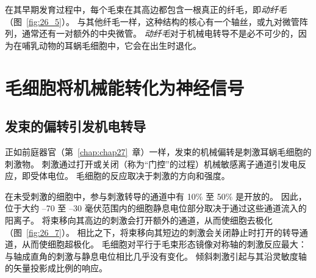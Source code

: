 在其早期发育过程中，每个毛束在其高边都包含一根真正的纤毛，即\textit{动纤毛}（图~\ref{fig:26_5}）。 
与其他纤毛一样，这种结构的核心有一个轴丝，或九对微管阵列，通常还有一对额外的中央微管。
\textit{动纤毛}对于机械电转导不是必不可少的，因为在哺乳动物的耳蜗毛细胞中，它会在出生时退化。



\section{毛细胞将机械能转化为神经信号}

\subsection{发束的偏转引发机电转导}

正如前庭器官（第~\ref{chap:chap27}~章）一样，发束的机械偏转是刺激耳蜗毛细胞的刺激物。
刺激通过打开或关闭（称为“门控”的过程）机械敏感离子通道引发电反应，即受体电位。
毛细胞的反应取决于刺激的方向和强度。


在未受刺激的细胞中，参与刺激转导的通道中有 10\% 至 50\% 是开放的。
因此，位于大约 –70 至 –30 毫伏范围内的细胞静息电位部分取决于通过这些通道流入的阳离子。
将束移向其高边的刺激会打开额外的通道，从而使细胞去极化（图~\ref{fig:26_7}）。
相比之下，将束移向其短边的刺激会关闭静止时打开的转导通道，从而使细胞超极化。
毛细胞对平行于毛束形态镜像对称轴的刺激反应最大：
与轴成直角的刺激与静息电位相比几乎没有变化。
倾斜刺激引起与其沿灵敏度轴的矢量投影成比例的响应。


